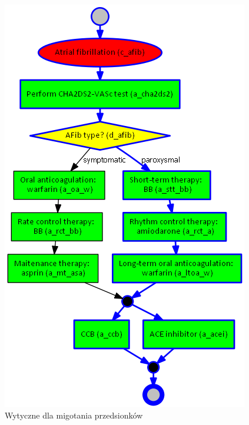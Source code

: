 \begin{figure}[H]
\centering
\includegraphics[scale=0.45]{img/afib-ver-4.png}
\caption{Wytyczne dla migotania przedsionków}
\label{fig:afib}
\end{figure}


